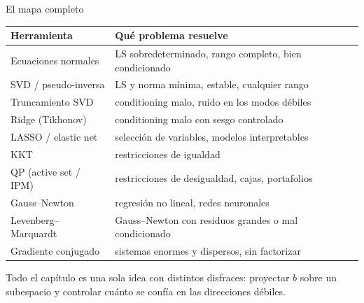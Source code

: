 \documentclass[10pt,aspectratio=169]{beamer}
\begin{document}
\begin{frame}{El mapa completo}
  \centering
  \small
  \vspace{2mm}
  \begin{tabular}{@{}p{}p{}@{}}
    \toprule
    \textbf{Herramienta} & \textbf{Qué problema resuelve} \\
    \midrule
    Ecuaciones normales & LS sobredeterminado, rango completo, bien condicionado \\
    SVD / pseudo-inversa & LS y norma mínima, estable, cualquier rango \\
    Truncamiento SVD & conditioning malo, ruido en los modos débiles \\
    Ridge (Tikhonov) & conditioning malo con sesgo controlado \\
    LASSO / elastic net & selección de variables, modelos interpretables \\
    KKT & restricciones de igualdad \\
    QP (active set / IPM) & restricciones de desigualdad, cajas, portafolios \\
    Gauss--Newton & regresión no lineal, redes neuronales \\
    Levenberg--Marquardt & Gauss--Newton con residuos grandes o mal condicionado \\
    Gradiente conjugado & sistemas enormes y dispersos, sin factorizar \\
    \bottomrule
  \end{tabular}

  \vspace{4mm}
  {\footnotesize\color{gray}
    Todo el capítulo es una sola idea con distintos disfraces: proyectar
    $b$ sobre un subespacio y controlar cuánto se confía en las direcciones
    débiles.}
\end{frame}
\end{document}
